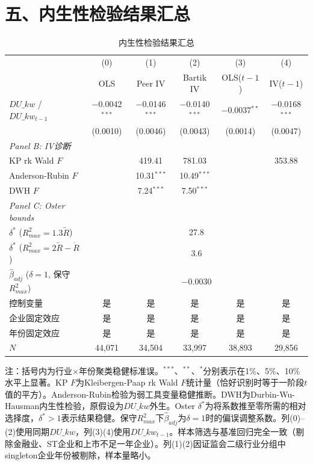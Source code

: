 \documentclass[11pt,a4paper]{article}
\begin{document}
\section*{五、内生性检验结果汇总}

\begin{table}[htbp]
\centering
\caption{内生性检验结果汇总}
\label{tab:iv}
\vspace{6pt}
\begin{tabular}{lccccc}
\toprule
& (0) & (1) & (2) & (3) & (4) \\
& OLS & Peer IV & Bartik IV & OLS($t{-}1$) & IV($t{-}1$) \\
\midrule
$DU\_kw$ / $DU\_kw_{t-1}$ & $-$0.0042$^{***}$ & $-$0.0146$^{***}$ & $-$0.0140$^{***}$ & $-$0.0037$^{**}$ & $-$0.0168$^{***}$ \\
& (0.0010) & (0.0046) & (0.0043) & (0.0014) & (0.0047) \\[6pt]
\textit{Panel B: IV诊断} \\[3pt]
KP rk Wald $F$ & & 419.41 & 781.03 & & 353.88 \\
Anderson-Rubin $F$ & & 10.31$^{***}$ & 10.49$^{***}$ & & \\
DWH $F$ & & 7.24$^{***}$ & 7.50$^{***}$ & & \\[3pt]
\textit{Panel C: Oster bounds} \\[3pt]
$\delta^*$ ($R^2_{max}=1.3\tilde{R}$) & \multicolumn{5}{c}{27.8} \\
$\delta^*$ ($R^2_{max}=2\tilde{R}-\dot{R}$) & \multicolumn{5}{c}{3.6} \\
$\hat{\beta}_{adj}$ ($\delta=1$, 保守$R^2_{max}$) & \multicolumn{5}{c}{$-$0.0030} \\[3pt]
\midrule
控制变量 & 是 & 是 & 是 & 是 & 是 \\
企业固定效应 & 是 & 是 & 是 & 是 & 是 \\
年份固定效应 & 是 & 是 & 是 & 是 & 是 \\
$N$ & 44,071 & 34,504 & 33,997 & 38,893 & 29,856 \\
\bottomrule
\end{tabular}

\vspace{6pt}
{\small 注：括号内为行业$\times$年份聚类稳健标准误。$^{***}$、$^{**}$、$^{*}$分别表示在1\%、5\%、10\%水平上显著。KP $F$为Kleibergen-Paap rk Wald $F$统计量（恰好识别时等于一阶段$t$值的平方）。Anderson-Rubin检验为弱工具变量稳健推断。DWH为Durbin-Wu-Hausman内生性检验，原假设为$DU\_kw$外生。Oster $\delta^*$为将系数推至零所需的相对选择度，$\delta^*>1$表示结果稳健。保守$R^2_{max}$下$\hat{\beta}_{adj}$为$\delta=1$时的偏误调整系数。列(0)--(2)使用同期$DU\_kw$，列(3)(4)使用$DU\_kw_{t-1}$。样本筛选与基准回归完全一致（剔除金融业、ST企业和上市不足一年企业）。列(1)(2)因证监会二级行业分组中singleton企业年份被剔除，样本量略小。}
\end{table}
\end{document}
